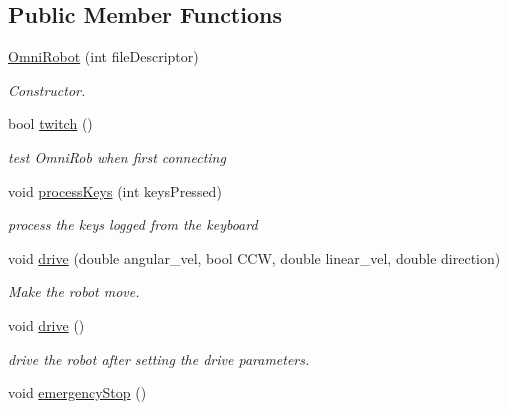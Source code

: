 \subsection*{Public Member Functions}
\begin{DoxyCompactItemize}
\item 
\hyperlink{class_omni_robot_a0adede977dc636bdc42c99edb148d176}{Omni\+Robot} (int file\+Descriptor)
\begin{DoxyCompactList}\small\item\em Constructor. \end{DoxyCompactList}\item 
\hypertarget{class_omni_robot_aa1fdc3c89c1cc303fc2416142af847ba}{}bool \hyperlink{class_omni_robot_aa1fdc3c89c1cc303fc2416142af847ba}{twitch} ()\label{class_omni_robot_aa1fdc3c89c1cc303fc2416142af847ba}

\begin{DoxyCompactList}\small\item\em test Omni\+Rob when first connecting \end{DoxyCompactList}\item 
\hypertarget{class_omni_robot_a9098e781569c5da8c5fdd16be6310866}{}void \hyperlink{class_omni_robot_a9098e781569c5da8c5fdd16be6310866}{process\+Keys} (int keys\+Pressed)\label{class_omni_robot_a9098e781569c5da8c5fdd16be6310866}

\begin{DoxyCompactList}\small\item\em process the keys logged from the keyboard \end{DoxyCompactList}\item 
void \hyperlink{class_omni_robot_a4bf623e941d12271de06a3feca707f1f}{drive} (double angular\+\_\+vel, bool C\+C\+W, double linear\+\_\+vel, double direction)
\begin{DoxyCompactList}\small\item\em Make the robot move. \end{DoxyCompactList}\item 
void \hyperlink{class_omni_robot_ad0719d67222bcea330964a193d8bf717}{drive} ()
\begin{DoxyCompactList}\small\item\em drive the robot after setting the drive parameters. \end{DoxyCompactList}\item 
\hypertarget{class_omni_robot_af8a7e63e307d39cd63f9ad8ff1b8f438}{}void \hyperlink{class_omni_robot_af8a7e63e307d39cd63f9ad8ff1b8f438}{emergency\+Stop} ()\label{class_omni_robot_af8a7e63e307d39cd63f9ad8ff1b8f438}


\end{DoxyCompactItemize}
